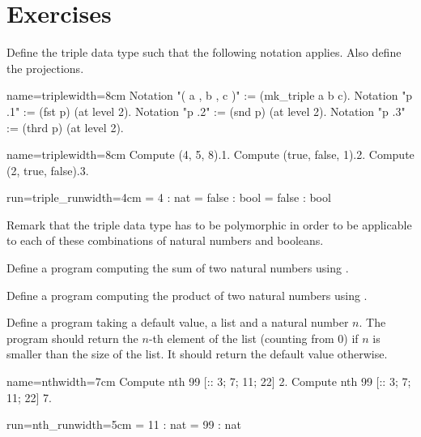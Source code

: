 \newpage
\section{Exercises}

\begin{Exercise}[label=ex:triple,difficulty=0,title={The triple data type}]
Define the triple data type such that the following notation
applies.  Also define the projections.

\begin{coq}{name=triple}{width=8cm}
Notation "( a , b , c )" := (mk_triple a b c).
Notation "p .1" := (fst p) (at level 2).
Notation "p .2" := (snd p) (at level 2).
Notation "p .3" := (thrd p) (at level 2).
\end{coq}
\begin{coq-left}{name=triple}{width=8cm}
Compute (4, 5, 8).1.
Compute (true, false, 1).2.
Compute (2, true, false).3.
\end{coq-left}
\begin{coqout-right}{run=triple_run}{width=4cm}
 = 4 : nat
 = false : bool
 = false : bool
\end{coqout-right}

Remark that the triple data type has to be polymorphic in order to
be applicable to each of these combinations of natural numbers and
booleans.
\end{Exercise}

\begin{Exercise}[label=ex:iteradd,difficulty=0,title={Addition with iteration}]
Define a program computing the sum of two natural numbers
using .
\end{Exercise}

\begin{Exercise}[label=ex:itermul,difficulty=0,title={Multiplication with iteration}]
Define a program computing the product of two natural numbers
using .
\end{Exercise}

\begin{Exercise}[label=ex:nth,difficulty=0,title={Find the n-th element}]
Define a program taking a default value, a list and  a natural number \(n\).
The program should return the \(n\)-th element of the list (counting
from \(0\)) if \(n\)
is smaller than the size of the list.  It should return
the default value otherwise.

\begin{coq-left}{name=nth}{width=7cm}
Compute
  nth 99 [:: 3; 7; 11; 22] 2.
Compute
  nth 99 [:: 3; 7; 11; 22] 7.
\end{coq-left}
\begin{coqout-right}{run=nth_run}{width=5cm}
 = 11
 : nat
 = 99
 : nat
\end{coqout-right}
\end{Exercise}

